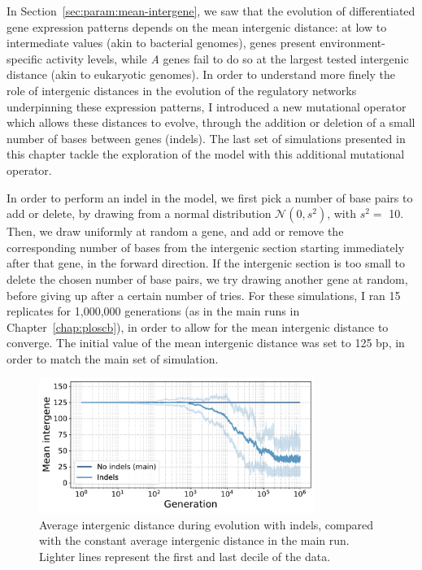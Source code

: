 In Section~\ref{sec:param:mean-intergene}, we saw that the evolution of differentiated gene expression patterns depends on the mean intergenic distance: at low to intermediate values (akin to bacterial genomes), genes present environment-specific activity levels, while \emph{A} genes fail to do so at the largest tested intergenic distance (akin to eukaryotic genomes).
In order to understand more finely the role of intergenic distances in the evolution of the regulatory networks underpinning these expression patterns, I introduced a new mutational operator which allows these distances to evolve, through the addition or deletion of a small number of bases between genes (indels).
The last set of simulations presented in this chapter tackle the exploration of the model with this additional mutational operator.

In order to perform an indel in the model, we first pick a number of base pairs to add or delete, by drawing from a normal distribution $\mathcal{N}(0, s^2)$, with $s^2 = $ 10.
Then, we draw uniformly at random a gene, and add or remove the corresponding number of bases from the intergenic section starting immediately after that gene, in the forward direction.
If the intergenic section is too small to delete the chosen number of base pairs, we try drawing another gene at random, before giving up after a certain number of tries.
For these simulations, I ran 15 replicates for 1,000,000 generations (as in the main runs in Chapter~\ref{chap:ploscb}), in order to allow for the mean intergenic distance to converge.
The initial value of the mean intergenic distance was set to 125 bp, in order to match the main set of simulation.

\begin{figure}[H]
\centering
\includegraphics[width=0.8\textwidth]{param/evolve-intergene/intergenic_size_all.pdf}
\caption[Average intergenic size during evolution, with indels]{Average intergenic distance during evolution with indels, compared with the constant average intergenic distance in the main run.
Lighter lines represent the first and last decile of the data.}
\label{fig:param:evolve-intergene-intergene}
\end{figure}


